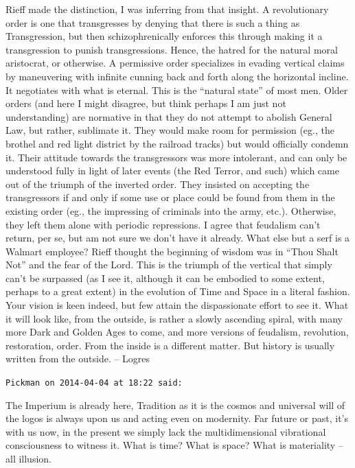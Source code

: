 \begin{footnotesize}
\begin{sffamily}
Rieff made the distinction, I was inferring from that insight. A revolutionary order is one that transgresses by denying that there is such a thing as Transgression, but then schizophrenically enforces this through making it a transgression to punish transgressions. Hence, the hatred for the natural moral aristocrat, or otherwise. A permissive order specializes in evading vertical claims by maneuvering with infinite cunning back and forth along the horizontal incline. It negotiates with what is eternal. This is the ``natural state'' of most men. Older orders (and here I might disagree, but think perhaps I am just not understanding) are normative in that they do not attempt to abolish General Law, but rather, sublimate it. They would make room for permission (eg., the brothel and red light district by the railroad tracks) but would officially condemn it. Their attitude towards the transgressors was more intolerant, and can only be understood fully in light of later events (the Red Terror, and such) which came out of the triumph of the inverted order. They insisted on accepting the transgressors if and only if some use or place could be found from them in the existing order (eg., the impressing of criminals into the army, etc.). Otherwise, they left them alone with periodic repressions. I agree that feudalism can't return, per se, but am not sure we don't have it already. What else but a serf is a Walmart employee? Rieff thought the beginning of wisdom was in ``Thou Shalt Not'' and the fear of the Lord. This is the triumph of the vertical that simply can't be surpassed (as I see it, although it can be embodied to some extent, perhaps to a great extent) in the evolution of Time and Space in a literal fashion. Your vision is keen indeed, but few attain the dispassionate effort to see it. What it will look like, from the outside, is rather a slowly ascending spiral, with many more Dark and Golden Ages to come, and more versions of feudalism, revolution, restoration, order. From the inside is a different matter. But history is usually written from the outside. -- Logres

\hfill

\texttt{Pickman on 2014-04-04 at 18:22 said:}

The Imperium is already here, Tradition as it is the cosmos and universal will of the logos is always upon us and acting even on modernity. Far future or past, it's with us now, in the present we simply lack the multidimensional vibrational consciousness to witness it. What is time? What is space? What is materiality -- all illusion.


\end{sffamily}
\end{footnotesize}
